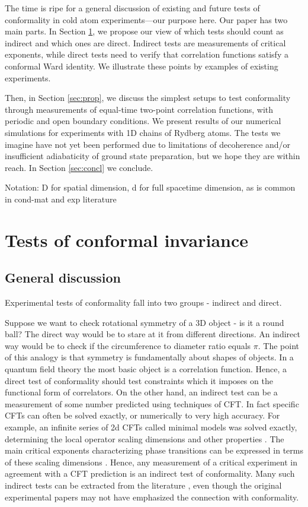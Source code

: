 \documentclass[a4paper,11pt]{article}
\theoremstyle{remark}
\theoremstyle{theorem}
\begin{document}
The time is ripe for a general discussion of existing and future tests of conformality in cold atom experiments---our purpose here. Our paper has two main parts. In Section \ref{sec:gen}, we propose our view of which tests should count as indirect and which ones are direct. Indirect tests are measurements of critical exponents, while direct tests need to verify that correlation functions satisfy a conformal Ward identity. We illustrate these points by examples of existing experiments. 

Then, in Section \ref{sec:prop},  we discuss the simplest setups to test conformality through measurements of equal-time two-point correlation functions, with periodic and open boundary conditions. We present results of our numerical simulations for experiments with 1D chains of Rydberg atoms. The tests we imagine have not yet been performed due to limitations of decoherence and/or insufficient adiabaticity of ground state preparation, but we hope they are within reach. In Section \ref{sec:concl} we conclude.

Notation: D for spatial dimension, d for full spacetime dimension, as is common in cond-mat and exp literature
\section{Tests of conformal invariance}
\label{sec:gen}

\subsection{General discussion}
Experimental tests of conformality fall into two groups - indirect and direct.

Suppose we want to check rotational symmetry of a 3D object - is it a round ball? The direct way would be to stare at it from different directions. An indirect way would be to check if the circumference to diameter ratio equals $\pi$. 
The point of this analogy is that symmetry is fundamentally about shapes of objects. In a quantum field theory the most basic object is a correlation function. Hence, a direct test of conformality should test constraints which it imposes on the functional form of correlators. On the other hand, an indirect test can be a measurement of some number predicted using techniques of CFT. In fact specific CFTs can often be solved exactly, or numerically to very high accuracy. For example, an infinite series of 2d CFTs called minimal models was solved exactly, determining the local operator scaling dimensions and other properties \cite{Belavin:1984vu,DiFrancesco:1997nk}. The main critical exponents characterizing phase transitions can be expressed in terms of these scaling dimensions \cite{cardy1996scaling}. Hence, any measurement of a critical experiment in agreement with a CFT prediction is an indirect test of conformality. Many such indirect tests can be extracted from the literature \cite{Henkel1999,Rychkov:2025zks}, even though the original experimental papers may not have emphasized the connection with conformality.
\end{document}
